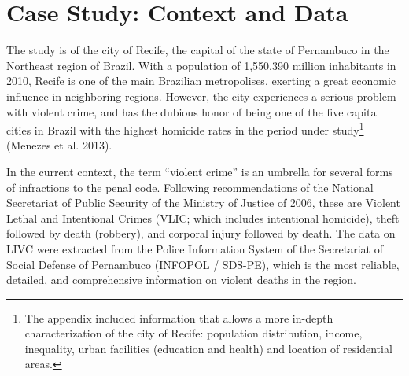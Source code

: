 \documentclass[smallextended]{svjour3}       %
\begin{document}
\hypertarget{case}{%
\section{Case Study: Context and Data}\label{case}}

The study is of the city of Recife, the capital of the state of
Pernambuco in the Northeast region of Brazil. With a population of
1,550,390 million inhabitants in 2010, Recife is one of the main
Brazilian metropolises, exerting a great economic influence in
neighboring regions. However, the city experiences a serious problem
with violent crime, and has the dubious honor of being one of the five
capital cities in Brazil with the highest homicide rates in the period
under
study\footnote{The appendix included information that allows a more in-depth characterization of the city of Recife: population distribution, income, inequality, urban facilities (education and health) and location of residential areas.}
(Menezes et al. 2013).

In the current context, the term ``violent crime'' is an umbrella for
several forms of infractions to the penal code. Following
recommendations of the National Secretariat of Public Security of the
Ministry of Justice of 2006, these are Violent Lethal and Intentional
Crimes (VLIC; which includes intentional homicide), theft followed by
death (robbery), and corporal injury followed by death. The data on LIVC
were extracted from the Police Information System of the Secretariat of
Social Defense of Pernambuco (INFOPOL / SDS-PE), which is the most
reliable, detailed, and comprehensive information on violent deaths in
the region.
\end{document}
